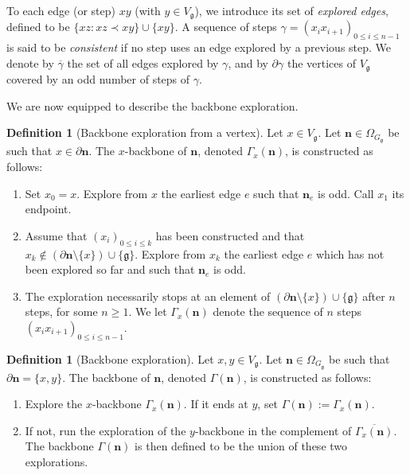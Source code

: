 \documentclass[11pt,a4paper]{article}
\numberwithin{equation}{section}
\theoremstyle{plain}
\theoremstyle{definition}
\newtheorem{Def}[Thm]{Definition}
\newcommand\n{\mathbf{n}}
\newcommand\sn{\partial\mathbf{n}}
\newcommand\fg{\mathfrak{g}}
\begin{document}
 To each edge (or step) $xy$ (with $y\in V_\fg$), we introduce its set of \emph{explored edges}, defined to be $\{xz: xz\prec xy\}\cup \{xy\}$. A sequence of steps $\gamma=(x_ix_{i+1})_{0\leq i\leq n-1}$ is said to be \emph{consistent} if no step uses an edge explored by a previous step. We denote by $\overline{\gamma}$ the set of all edges explored by $\gamma$, and by $\partial \gamma$ the vertices of $V_\fg$ covered by an odd number of steps of $\gamma$. 

We are now equipped to describe the backbone exploration.

\begin{Def}[Backbone exploration from a vertex] Let $x\in V_\fg$. Let $\n\in \Omega_{G_{\fg}}$ be such that $x\in \sn$. The $x$-backbone of $\n$, denoted $\Gamma_x(\n)$, is constructed as follows:
\begin{enumerate}
	\item[$(i)$] Set $x_0=x$. Explore from $x$ the earliest edge $e$ such that $\n_e$ is odd. Call $x_1$ its endpoint.
	 \item[$(ii)$] Assume that $(x_i)_{0\leq i\leq k}$ has been constructed and that $x_k\notin(\sn\setminus\{x\})\cup\{\fg\}$. Explore from $x_k$ the earliest edge $e$ which has not been explored so far and such that $\n_e$ is odd.
	 \item[$(iii)$] The exploration necessarily stops at an element of $(\sn\setminus\{x\})\cup\{\fg\}$ after $n$ steps, for some $n\geq 1$. We let $\Gamma_x(\n)$ denote the sequence of $n$ steps $(x_ix_{i+1})_{0\leq i \leq n-1}$.
		\end{enumerate}
		\end{Def}

	\begin{Def}[Backbone exploration] Let $x,y\in V_\fg$. Let $\n\in \Omega_{G_\fg}$ be such that $\sn=\{x,y\}$. The backbone of $\n$, denoted $\Gamma(\n)$, is constructed as follows:
	\begin{enumerate}
		\item[$(i)$] Explore the $x$-backbone $\Gamma_x(\n)$. If it ends at $y$, set $\Gamma(\n):=\Gamma_x(\n)$.
		\item[$(ii)$] If not, run the exploration of the $y$-backbone in the complement of $\overline{\Gamma_x(\n)}$. The backbone $\Gamma(\n)$ is then defined to be the union of these two explorations.
	\end{enumerate}
	\end{Def}
\end{document}
